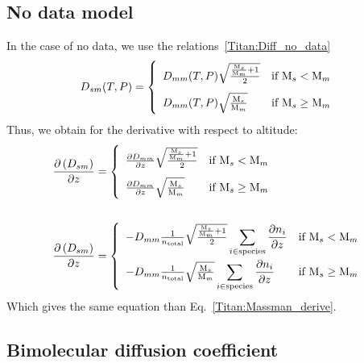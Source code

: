 \subsection{No data model}

In the case of no data, we use the relations~\ref{Titan:Diff_no_data}
\begin{equation}
\renewcommand{\arraystretch}{2}
\diff_{sm}(T,P) =
\left\{\begin{array}{l@{\quad}r}
\diff_{mm}(T,P)\sqrt{\frac{\frac{\Mm_s}{\Mm_m} + 1}{2}} & \text{if }\Mm_s < \Mm_m    \\
\diff_{mm}(T,P)\sqrt{\frac{\Mm_s}{\Mm_m}}               & \text{if }\Mm_s \geq \Mm_m \\
\end{array}\right.
\label{Titan:Diff_no_data}
\end{equation}
Thus, we obtain for the derivative with respect to altitude:
\begin{equation}
\begin{split}
\renewcommand{\arraystretch}{2}
\dOverd{\diff_{sm}}{z} & =
\left\{\begin{array}{l@{\quad}r}
\doverd{\diff_{mm}}{z}\sqrt{\frac{\frac{\Mm_s}{\Mm_m} + 1}{2}}  & \text{if } \Mm_s < \Mm_m    \\
\doverd{\diff_{mm}}{z}\sqrt{\frac{\Mm_s}{\Mm_m}}                                       & \text{if } \Mm_s \geq \Mm_m \\
\end{array}\right. 
\\\\
\dOverd{\diff_{sm}}{z} & =
\left\{\begin{array}{l@{\quad}r}
-\diff_{mm}\frac{1}{\concAtm}\sqrt{\frac{\frac{\Mm_s}{\Mm_m} + 1}{2}}\displaystyle\sum_{i\in\text{species}}\doverd{\conc_i}{z}  & \text{if } \Mm_s < \Mm_m    \\
-\diff_{mm}\frac{1}{\concAtm}\sqrt{\frac{\Mm_s}{\Mm_m}}\displaystyle\sum_{i\in\text{species}}\doverd{\conc_i}{z}                & \text{if } \Mm_s \geq \Mm_m \\
\end{array}\right. 
\end{split}
\label{Titan:diffusion_no_data_derive}
\end{equation}
Which gives the same equation than Eq.~\ref{Titan:Massman_derive}.

\subsection{Bimolecular diffusion coefficient}

